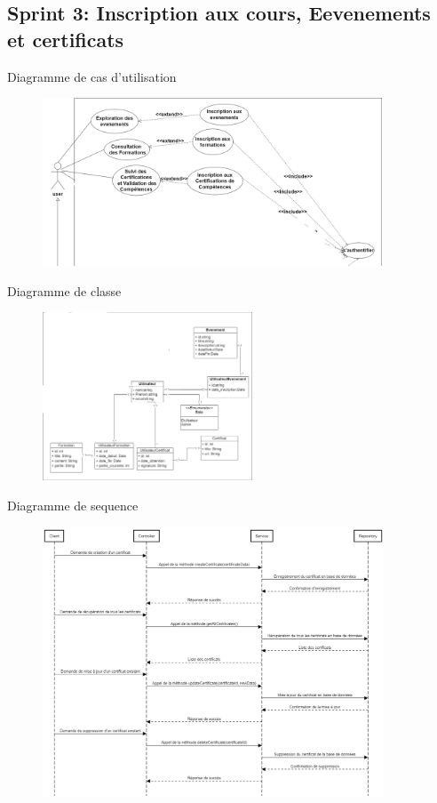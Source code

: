 \subsection{Sprint 3: Inscription aux cours, Eevenements et
    certificats}
\begin{frame}{Diagramme de cas d'utilisation}

    \begin{figure}[H]
        \centering
        \includegraphics[height=5cm]{assets/images/sprint3-usecase.png}
    \end{figure}
\end{frame}

\begin{frame}{Diagramme de classe}

    \begin{figure}[H]
        \centering
        \includegraphics[height=5cm]{assets/images/sprint2-class.png}
    \end{figure}
\end{frame}


\begin{frame}{Diagramme de sequence}
    \begin{figure}[H]
        \centering
        \includegraphics[height=8cm]{assets/images/seq-certifs.png}
    \end{figure}
\end{frame}


